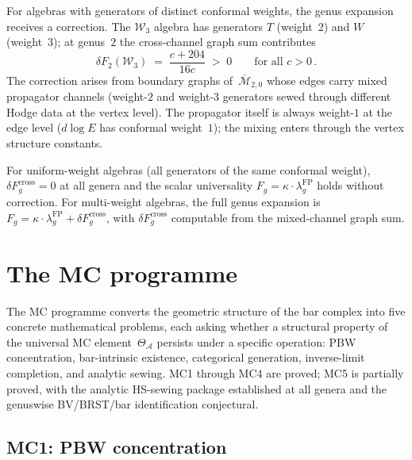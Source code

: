 \documentclass[11pt,reqno]{amsart}
\theoremstyle{definition}
\theoremstyle{remark}
\newcommand{\cA}{\mathcal{A}}
\newcommand{\cM}{\mathcal{M}}
\numberwithin{equation}{section}
\newcommand{\cW}{\mathcal{W}}
\begin{document}
For algebras with generators of distinct conformal
weights, the genus expansion
receives a correction. The $\cW_3$ algebra has generators
$T$ (weight~$2$) and $W$ (weight~$3$); at genus~$2$ the
cross-channel graph sum contributes
\begin{equation}\label{eq:delta-f2-w3}
\delta F_2(\cW_3)
\;=\;
\frac{c + 204}{16c}
\;>\; 0
\qquad
\text{for all } c > 0\,.
\end{equation}
The correction arises from boundary graphs
of~$\overline{\cM}_{2,0}$ whose edges carry mixed
propagator channels (weight-$2$ and weight-$3$ generators
sewed through different Hodge data at the vertex level).
The propagator itself is always weight-$1$ at the edge
level ($d\log E$ has conformal weight~$1$); the mixing
enters through the vertex structure constants.

For uniform-weight algebras (all generators of the same
conformal weight), $\delta F_g^{\mathrm{cross}} = 0$
at all genera and the scalar universality
$F_g = \kappa \cdot \lambda_g^{\mathrm{FP}}$ holds
without correction. For multi-weight algebras, the
full genus expansion is
$F_g = \kappa \cdot \lambda_g^{\mathrm{FP}}
+ \delta F_g^{\mathrm{cross}}$,
with
$\delta F_g^{\mathrm{cross}}$ computable from the
mixed-channel graph sum.


\section{The MC programme}
\label{sec:mc-programme}

The MC programme converts the geometric structure of the
bar complex into five concrete mathematical problems, each
asking whether a structural property of the universal MC
element~$\Theta_\cA$ persists under a specific operation:
PBW concentration, bar-intrinsic existence, categorical
generation, inverse-limit completion, and analytic sewing.
MC1 through MC4 are proved; MC5 is partially proved, with
the analytic HS-sewing package established at all genera
and the genuswise BV/BRST/bar identification conjectural.

\subsection{MC1: PBW concentration}
\label{ssec:mc1}
\end{document}
